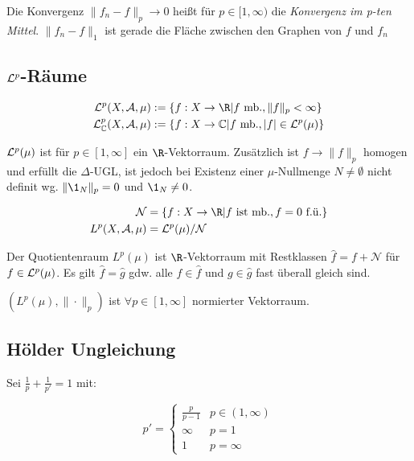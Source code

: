 \spacing

Die Konvergenz $\| f_n - f \|_p \to 0$ heißt für $p \in [1,\infty)$ die \emph{Konvergenz im p-ten Mittel}. $\| f_n - f \|_1$ ist gerade die Fläche zwischen den Graphen von $f$ und $f_n$

\subsection*{$\mathcal{L}^p$-Räume}

\vspace{-4mm}
\begin{align*}
\L^p(X,\A,\mu) &:= \{ f : X \to \R | f \text{ mb.}, \|f\|_p < \infty\} \\
\L_\mathbb{C}^p(X,\A,\mu) &:= \{ f : X \to \mathbb{C} | f \text{ mb.}, |f| \in \L^p(\mu) \}
\end{align*}

$\mathcal{L}^p(\mu)$ ist für $p \in [1,\infty]$ ein $\R$-Vektorraum. Zusätzlich ist $f \to \|f\|_p$ homogen und erfüllt die $\Delta$-UGL, ist jedoch bei Existenz einer $\mu$-Nullmenge $N \neq \emptyset$ nicht definit wg. $\|\1_N\|_p = 0$ und $\1_N \neq 0$.

\vspace{-4mm}
\begin{align*}
\mathcal{N} &= \{ f : X \to \R | f \text{ ist mb.}, f = 0 \text{ f.ü.}\} \\
L^p(X,\A,\mu) &= \L^p(\mu) / \mathcal{N}
\end{align*}

Der Quotientenraum $L^p(\mu)$ ist $\R$-Vektorraum mit Restklassen $\hat f = f + \mathcal{N}$ für $f \in \mathcal{L}^p(\mu)$. Es gilt $\hat f = \hat g$ gdw. alle $f \in \hat f$ und $g \in \hat g$ fast überall gleich sind.

\spacing

$(L^p(\mu),\|\cdot\|_p)$ ist $\forall p \in [1,\infty]$ normierter Vektorraum.

\subsection*{Hölder Ungleichung}

Sei $\frac{1}{p} + \frac{1}{p'} = 1$ mit:

\vspace{-4mm}
$$p' = \begin{cases}
	\frac{p}{p-1} & p \in (1, \infty) \\
	\infty        & p = 1 \\
	1        & p = \infty
\end{cases}$$

